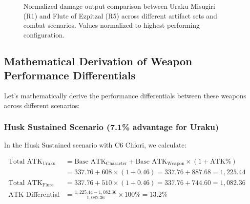 \documentclass[12pt,a4paper]{article}
\begin{document}
\begin{figure}[H]
\centering
{}
\caption{Normalized damage output comparison between Uraku Misugiri (R1) and Flute of Ezpitzal (R5) across different artifact sets and combat scenarios. Values normalized to highest performing configuration.}
\label{fig:weapon_comparison}
\end{figure}

\subsection{Mathematical Derivation of Weapon Performance Differentials}

Let's mathematically derive the performance differentials between these weapons across different scenarios:

\subsubsection{Husk Sustained Scenario (7.1\% advantage for Uraku)}

In the Husk Sustained scenario with C6 Chiori, we calculate:

\begin{align}
\text{Total ATK}_{\text{Uraku}} &= \text{Base ATK}_{\text{Character}} + \text{Base ATK}_{\text{Weapon}} \times (1 + \text{ATK\%}) \\
&= 337.76 + 608 \times (1 + 0.46) = 337.76 + 887.68 = 1,225.44 \\
\text{Total ATK}_{\text{Flute}} &= 337.76 + 510 \times (1 + 0.46) = 337.76 + 744.60 = 1,082.36 \\
\text{ATK Differential} &= \frac{1,225.44 - 1,082.36}{1,082.36} \times 100\% = 13.2\%
\end{align}
\end{document}
